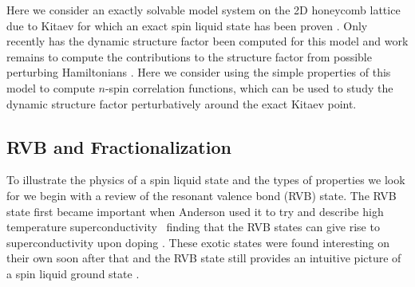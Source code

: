 \documentclass[aps,pra,preprint,groupedaddress]{revtex4-1}
\newcommand{\1}{\mathds{1}}
\begin{document}
Here we consider an exactly solvable model system on the 2D honeycomb lattice due to Kitaev \cite{Kitaev} for which an exact spin liquid state has been proven \cite{Kitaev}. Only recently has the dynamic structure factor been computed for this model \cite{Knolle,Trousselet} and work remains to compute the contributions to the structure factor from possible perturbing Hamiltonians \cite{Tikhonov}. Here we consider using the simple properties of this model to compute $n$-spin correlation functions, which can be used to study the dynamic structure factor perturbatively around the exact Kitaev point. 





\subsection{RVB and Fractionalization}			

To illustrate the physics of a spin liquid state and the types of properties we look for we begin with a review of the resonant valence bond (RVB) state. The RVB state first became important when Anderson used it to try and describe high temperature superconductivity~\cite{Anderson} finding that the RVB states can give rise to superconductivity upon doping \cite{Baskaran2}. These exotic states were found interesting on their own soon after that and the RVB state still provides an intuitive picture of a spin liquid ground state \cite{Mila}. 
\end{document}
